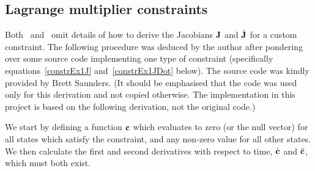 %
%


\subsection{Lagrange multiplier constraints}

Both~\cite{BaraffWitkin:97} and~\cite{Saunders:PhD} omit details of how to derive the Jacobians
$\m{J}$ and $\dot{\m{J}}$ for a custom constraint. The following procedure was deduced
by the author after pondering over some source code implementing one type of constraint
(specifically equations~\ref{constrEx1J} and~\ref{constrEx1JDot} below). The source code
was kindly provided by Brett Saunders. (It should be emphasised that the code was used only
for this derivation and not copied otherwise. The implementation in this project is based
on the following derivation, not the original code.)

We start by defining a function $\ve{c}$ which evaluates to zero (or the null vector) for
all states which satisfy the constraint, and any non-zero value for all other states. 
We then calculate the first and second derivatives with respect to time, $\dot{\ve{c}}$
and $\ddot{\ve{c}}$, which must both exist.

